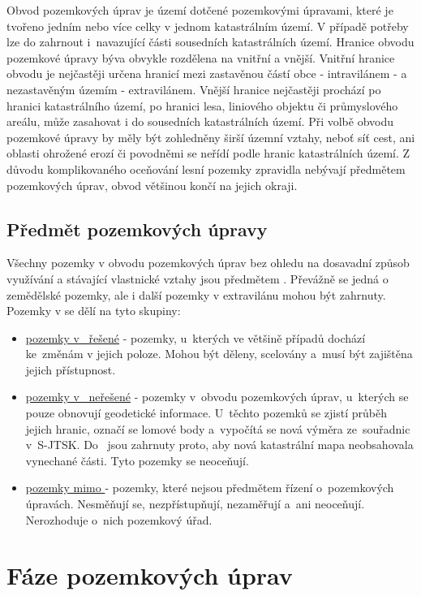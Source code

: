 Obvod pozemkových úprav je území dotčené pozemkovými úpravami, které je tvořeno jedním nebo více celky v jednom katastrálním území. V případě potřeby lze do  zahrnout i~navazující části sousedních katastrálních území. Hranice obvodu pozemkové úpravy býva obvykle rozdělena na vnitřní a vnější. Vnitřní hranice obvodu je nejčastěji určena hranicí mezi zastavěnou částí obce - intravilánem - a nezastavěným územím - extravilánem. Vnější hranice nejčastěji prochází po hranici katastrálního území, po hranici lesa, liniového objektu či průmyslového areálu, může zasahovat i do sousedních katastrálních území. Při volbě obvodu pozemkové úpravy by měly být zohledněny širší územní vztahy, neboť síť cest, ani oblasti ohrožené erozí či povodněmi se neřídí podle hranic katastrálních území. Z důvodu komplikovaného oceňování lesní pozemky zpravidla nebývají předmětem pozemkových úprav, obvod většinou končí na jejich okraji.

\subsection{Předmět pozemkových úpravy}
\label{predmet_pu}

Všechny pozemky v obvodu pozemkových úprav bez ohledu na dosavadní způsob využívání a stávající vlastnické vztahy jsou předmětem . Převážně se jedná o zemědělské pozemky, ale i další pozemky v extravilánu mohou být zahrnuty. Pozemky v  se dělí na tyto skupiny:
	\begin{itemize}[leftmargin=1.5cm]
		\item \underline{pozemky v~ řešené} - pozemky, u~kterých ve většině případů dochází ke~změnám v jejich poloze. Mohou být děleny, scelovány a~musí být zajištěna jejich přístupnost.
		\item \underline{pozemky v~ neřešené} - pozemky v~obvodu pozemkových úprav, u~kterých se pouze obnovují geodetické informace. U~těchto pozemků se zjistí průběh jejich hranic, označí se lomové body a~vypočítá se nová výměra ze~souřadnic v~S-JTSK. Do~ jsou zahrnuty proto, aby nová katastrální mapa neobsahovala vynechané části. Tyto pozemky se neoceňují.
		\item \underline{pozemky mimo } - pozemky, které nejsou předmětem řízení o~pozemkových úpravách. Nesměňují se, nezpřístupňují, nezaměřují a~ani neoceňují. Nerozhoduje o~nich pozemkový úřad.
	\end{itemize}

\section{Fáze pozemkových úprav}
\label{etapy_pu}

